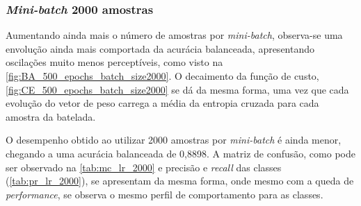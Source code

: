 \subsubsection*{\textit{Mini-batch} 2000 amostras}

Aumentando ainda mais o número de amostras por \textit{mini-batch}, observa-se uma envolução ainda mais comportada da acurácia balanceada, apresentando oscilações muito menos perceptíveis, como visto na \autoref{fig:BA_500_epochs_batch_size2000}. O decaimento da função de custo, \autoref{fig:CE_500_epochs_batch_size2000} se dá da mesma forma, uma vez que cada evolução do vetor de peso carrega a média da entropia cruzada para cada amostra da batelada.

O desempenho obtido ao utilizar 2000 amostras por \textit{mini-batch} é ainda menor, chegando a uma acurácia balanceada de 0,8898. A matriz de confusão, como pode ser observado na \autoref{tab:mc_lr_2000} e precisão e \textit{recall} das classes (\autoref{tab:pr_lr_2000}), se apresentam da mesma forma, onde mesmo com a queda de \textit{performance}, se observa o mesmo perfil de comportamento para as classes.

